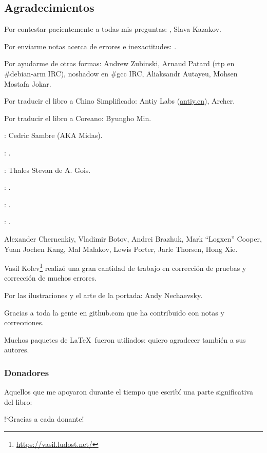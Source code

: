 \subsection*{Agradecimientos}

Por contestar pacientemente a todas mis preguntas: \HERMIT, Slava  Kazakov.

Por enviarme notas acerca de errores e inexactitudes: \PeopleMistakesInaccuracies{}.

Por ayudarme de otras formas:
Andrew Zubinski,
Arnaud Patard (rtp en \#debian-arm IRC),
noshadow en \#gcc IRC,
Aliaksandr Autayeu,
Mohsen Mostafa Jokar.

Por traducir el libro a Chino Simplificado:
Antiy Labs (\href{http://antiy.cn}{antiy.cn}), Archer.

Por traducir el libro a Coreano: Byungho Min.

\ESph{}: Cedric Sambre (AKA Midas).

\ESph{}: \PeopleSpanishTranslators{}.

\ESph{}: Thales Stevan de A. Gois.

\ESph{}: \PeopleItalianTranslators{}.

\ESph{}: \PeopleFrenchTranslators{}.

\DEph{}: \PeopleGermanTranslators{}.

%
Alexander  Chernenkiy,
Vladimir Botov,
Andrei Brazhuk,
Mark ``Logxen'' Cooper, Yuan Jochen Kang, Mal Malakov, Lewis Porter, Jarle Thorsen, Hong Xie.

Vasil Kolev\footnote{\url{https://vasil.ludost.net/}} realiz\'o una gran cantidad de trabajo en correcci\'on de pruebas y correcci\'on de muchos errores.

Por las ilustraciones y el arte de la portada: Andy Nechaevsky.

Gracias a toda la gente en github.com que ha contribuido con notas y correcciones\FNGithubContributors{}.

Muchos paquetes de \LaTeX\ fueron utiliados: quiero agradecer tambi\'en a sus autores.

\subsubsection*{Donadores}

Aquellos que me apoyaron durante el tiempo que escrib\'i una parte significativa del libro:



!`Gracias a cada donante!

